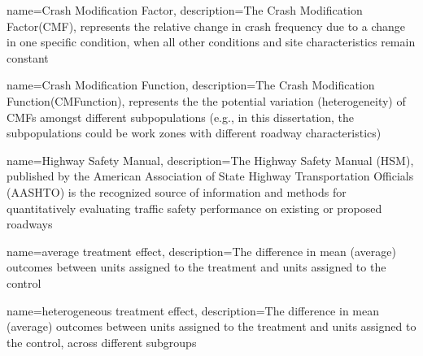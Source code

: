
\makenoidxglossaries

{
    name=Crash Modification Factor,
    description={The Crash Modification Factor(CMF), represents the relative change in
    crash frequency due to a change in one specific condition, when all other conditions and site characteristics remain constant}
}

{
    name=Crash Modification Function,
    description={The Crash Modification Function(CMFunction), represents the 
    the potential variation (heterogeneity) of CMFs amongst different subpopulations (e.g., in this dissertation, the subpopulations could be work zones with different roadway characteristics)}
}

{
    name=Highway Safety Manual,
    description={The Highway Safety Manual (HSM), published by the American Association of State Highway Transportation Officials (AASHTO) is the recognized source of information and methods for quantitatively evaluating traffic safety performance on existing or proposed roadways}
}


{
    name=average treatment effect,
    description={The difference in mean (average) outcomes between units assigned to the treatment and units assigned to the
    control}
}

{
    name=heterogeneous treatment effect,
    description={The difference in mean (average) outcomes between units assigned to the treatment and units assigned to the
    control, across different subgroups}
}
